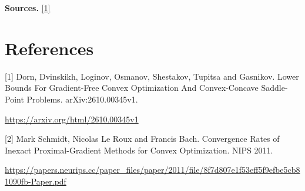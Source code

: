 \documentclass[10pt,a4paper]{article}
\begin{document}
\textbf{Sources.} \href{https://arxiv.org/html/2610.00345v1}{[1]}

\section{References}
[1] Dorn, Dvinskikh, Loginov, Osmanov, Shestakov, Tupitsa and Gasnikov. Lower Bounds For Gradient-Free Convex Optimization And Convex-Concave Saddle-Point Problems. arXiv:2610.00345v1.

\url{https://arxiv.org/html/2610.00345v1}

[2] Mark Schmidt, Nicolas Le Roux and Francis Bach. Convergence Rates of Inexact Proximal-Gradient Methods for Convex Optimization. NIPS 2011.

\url{https://papers.neurips.cc/paper_files/paper/2011/file/8f7d807e1f53eff5f9efbe5cb81090fb-Paper.pdf}
\end{document}
